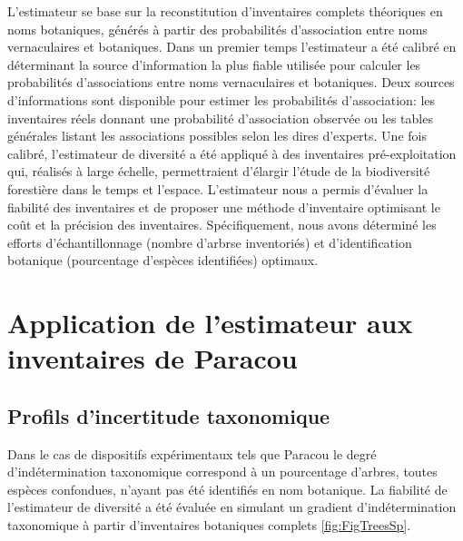 \documentclass[
  11pt,
  french,
  A4paper,
  extrafontsizes,onecolumn,openright
  ]{memoir}
\begin{document}
L'estimateur se base sur la reconstitution d'inventaires complets
théoriques en noms botaniques, générés à partir des probabilités
d'association entre noms vernaculaires et botaniques. Dans un premier
temps l'estimateur a été calibré en déterminant la source d'information
la plus fiable utilisée pour calculer les probabilités d'associations
entre noms vernaculaires et botaniques. Deux sources d'informations sont
disponible pour estimer les probabilités d'association: les inventaires
réels donnant une probabilité d'association observée ou les tables
générales listant les associations possibles selon les dires d'experts.
Une fois calibré, l'estimateur de diversité a été appliqué à des
inventaires pré-exploitation qui, réalisés à large échelle,
permettraient d'élargir l'étude de la biodiversité forestière dans le
temps et l'espace. L'estimateur nous a permis d'évaluer la fiabilité des
inventaires et de proposer une méthode d'inventaire optimisant le coût
et la précision des inventaires. Spécifiquement, nous avons déterminé
les efforts d'échantillonnage (nombre d'arbrse inventoriés) et
d'identification botanique (pourcentage d'espèces identifiées) optimaux.

\section{Application de l'estimateur aux inventaires de
Paracou}\label{application-de-lestimateur-aux-inventaires-de-paracou}

\subsection{Profils d'incertitude
taxonomique}\label{profils-dincertitude-taxonomique}

Dans le cas de dispositifs expérimentaux tels que Paracou le degré
d'indétermination taxonomique correspond à un pourcentage d'arbres,
toutes espèces confondues, n'ayant pas été identifiés en nom botanique.
La fiabilité de l'estimateur de diversité a été évaluée en simulant un
gradient d'indétermination taxonomique à partir d'inventaires botaniques
complets \ref{fig:FigTreesSp}.
\end{document}
